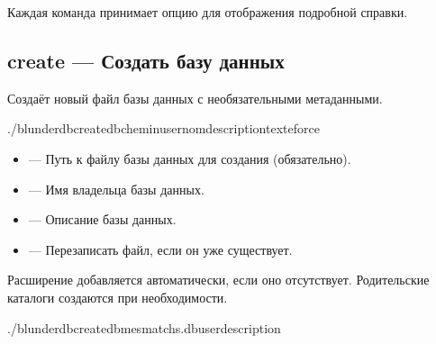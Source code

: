 \documentclass[letterpaper,10pt,russian]{sphinxmanual}
\begin{document}
\sphinxAtStartPar
Каждая команда принимает опцию  для отображения подробной справки.


\subsection{create — Создать базу данных}
\label{\detokenize{cli:create-creer-une-base-de-donnees}}
\sphinxAtStartPar
Создаёт новый файл базы данных с необязательными метаданными.

\begin{sphinxVerbatim}[commandchars=\\\{\}]
./blunderdbcreate\PYGZhy{}\PYGZhy{}db\PYGZlt{}chemin\PYGZgt{}\PYG{o}{[}\PYGZhy{}\PYGZhy{}user\PYGZlt{}nom\PYGZgt{}\PYG{o}{]}\PYG{o}{[}\PYGZhy{}\PYGZhy{}description\PYGZlt{}texte\PYGZgt{}\PYG{o}{]}\PYG{o}{[}\PYGZhy{}\PYGZhy{}force\PYG{o}{]}
\end{sphinxVerbatim}

\sphinxAtStartPar
{}
\begin{itemize}
\item {} 
\sphinxAtStartPar
{} — Путь к файлу базы данных для создания (обязательно).

\item {} 
\sphinxAtStartPar
{} — Имя владельца базы данных.

\item {} 
\sphinxAtStartPar
{} — Описание базы данных.

\item {} 
\sphinxAtStartPar
{} — Перезаписать файл, если он уже существует.

\end{itemize}

\sphinxAtStartPar
Расширение  добавляется автоматически, если оно отсутствует. Родительские каталоги создаются при необходимости.

\sphinxAtStartPar
{}

\begin{sphinxVerbatim}[commandchars=\\\{\}]
./blunderdbcreate\PYGZhy{}\PYGZhy{}dbmes\PYGZus{}matchs.db\PYGZhy{}\PYGZhy{}user\PYGZhy{}\PYGZhy{}description
\end{sphinxVerbatim}
\end{document}
